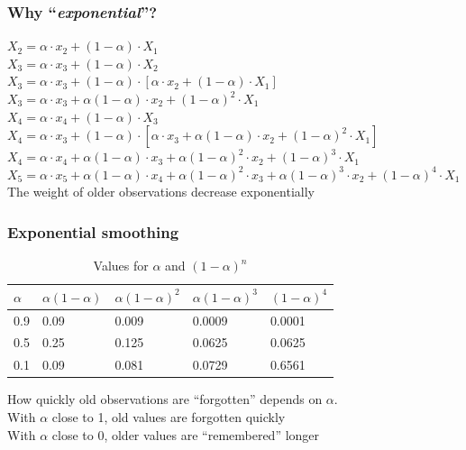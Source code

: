 \documentclass{beamer}
\begin{document}
\begin{frame}
  \frametitle{Why ``\emph{exponential}''?}

$ X_2 = \alpha \cdot x_2 + (1-\alpha) \cdot X_1 $\\
\vfill
$ X_3 = \alpha \cdot x_3 + (1-\alpha) \cdot X_2 $\\
$ X_3 = \alpha \cdot x_3 + (1-\alpha) \cdot \left[\alpha \cdot x_2 + (1-\alpha) \cdot X_1\right]  $\\
$ X_3 = \alpha \cdot x_3 + \alpha (1-\alpha) \cdot x_2 + (1-\alpha)^2 \cdot X_1  $\\
\vfill
$ X_4 = \alpha \cdot x_4 + (1-\alpha) \cdot X_3 $\\
$ X_4 = \alpha \cdot x_3 + (1-\alpha) \cdot \left[ \alpha \cdot x_3 + \alpha (1-\alpha) \cdot x_2 + (1-\alpha)^2 \cdot X_1\right]  $\\
$ X_4 = \alpha \cdot x_4 + \alpha (1-\alpha) \cdot x_3 + \alpha (1-\alpha)^2 \cdot x_2 + (1-\alpha)^3 \cdot X_1  $\\
\vfill
$ X_5 = \alpha \cdot x_5 + \alpha (1-\alpha) \cdot x_4 + \alpha (1-\alpha)^2 \cdot x_3 + \alpha (1-\alpha)^3 \cdot x_2 + (1-\alpha)^4 \cdot X_1  $\\
\vfill
The weight of older observations decrease exponentially
\end{frame}

\begin{frame}
  \frametitle{Exponential smoothing}

  \begin{table}
    \centering
    \begin{tabular}{l|llll}
      $\alpha$ & $\alpha(1-\alpha)$ & $\alpha(1-\alpha)^{2}$ & $\alpha(1-\alpha)^{3}$ & $(1-\alpha)^{4}$ \\ \hline
      0.9   & 0.09       & 0.009             & 0.0009                      & 0.0001           \\
      0.5   & 0.25       & 0.125             & 0.0625                      & 0.0625            \\
      0.1   & 0.09       & 0.081             & 0.0729                      & 0.6561           \\
    \end{tabular}
    \caption{Values for $\alpha$ and $(1-\alpha)^{n}$}
    \label{tab:alpha}
  \end{table}
  How quickly old observations are ``forgotten'' depends on $\alpha$.\\
  With $\alpha$ close to 1, old values are forgotten quickly\\
  With $\alpha$ close to 0, older values are ``remembered'' longer
\end{frame}
\end{document}
